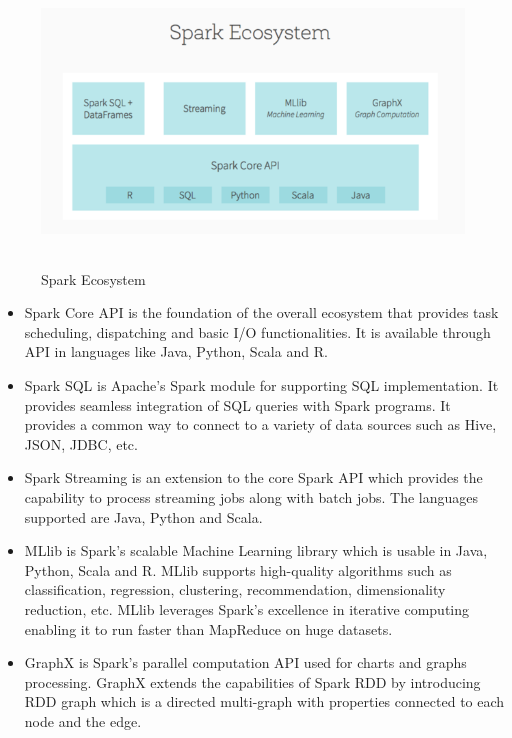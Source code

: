 \documentclass[sigconf]{acmart}
\begin{document}
\begin{figure}
\includegraphics[height=3in, width=5in]{images/spark-ecosystem}
\caption{Spark Ecosystem\cite{img_echo}}
\label{Figure 2}
\end{figure}

\begin{itemize}

	\item Spark Core API is the foundation of the overall ecosystem that provides task scheduling, dispatching and basic I/O functionalities. It is available through API in languages like Java, Python, Scala and R.

  \item Spark SQL is Apache's Spark module for supporting SQL implementation. It provides seamless integration of SQL queries with Spark programs. It provides a common way to connect to a variety of data sources such as Hive, JSON, JDBC, etc.
  
  \item Spark Streaming is an extension to the core Spark API which provides the capability to process streaming jobs along with batch jobs. The languages supported are Java, Python and Scala.

  \item MLlib is Spark's scalable Machine Learning library which is usable in Java, Python, Scala and R. MLlib supports high-quality algorithms such as classification, regression, clustering, recommendation, dimensionality reduction, etc. MLlib leverages Spark's excellence in iterative computing enabling it to run faster than MapReduce on huge datasets.

  \item GraphX is Spark's parallel computation API used for charts and graphs processing\cite{fu2016spark_p1}. GraphX extends the capabilities of Spark RDD by introducing RDD graph which is a directed multi-graph with properties connected to each node and the edge\cite{spark_a1}. 
  
\end{itemize}
\end{document}
